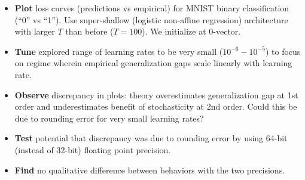 \documentclass[12pt]{article}
\begin{document}

        \begin{itemize}
            \item {\bf Plot} loss curves (predictions vs empirical) for MNIST binary classification (``0'' vs ``1'').
                Use super-shallow (logistic non-affine regression) architecture with larger $T$ than before ($T=100$).
                We initialize at $0$-vector.
            \item {\bf Tune} explored range of learning rates to be very small ($10^{-6} - 10^{-5}$) to focus on
                regime wherein empirical generalization gaps scale linearly with learning rate.
            \item {\bf Observe} discrepancy in plots: theory overestimates generalization gap at 1st order and
                underestimates benefit of stochasticity at 2nd order.  Could this be due to rounding error for very
                small learning rates?
            \item {\bf Test} potential that discrepancy was due to rounding error by using 64-bit (instead of 32-bit)
                floating point precision.
            \item {\bf Find} no qualitative difference between behaviors with the two precisions.
        \end{itemize}
\end{document}
